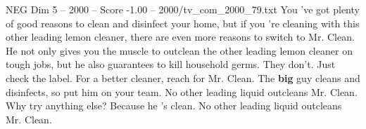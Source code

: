\begin{textsample}{NEG Dim 5 – 2000 – Score -1.00 – 2000/tv\_com\_2000\_79.txt}  \label{ex:f5_neg_040}
You 've got plenty of good reasons to clean and disinfect your home, but if you 're cleaning with this other leading lemon cleaner, there are even more reasons to switch to Mr.
Clean.
He not only gives you the muscle to outclean the other leading lemon cleaner on tough jobs, but he also guarantees to kill household germs.
They don't.
Just check the label.
For a better cleaner, reach for Mr.
Clean.
The \textbf{big} guy cleans and disinfects, so put him on your team.
No other leading liquid outcleans Mr.
Clean.
Why try anything else?
Because he 's clean.
No other leading liquid outcleans Mr.
Clean.

\end{textsample}
